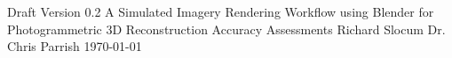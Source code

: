 \documentclass{article}
\begin{document}
\insertOSUTitleTwo
{Draft}
{Version 0.2}
{A Simulated Imagery Rendering Workflow using Blender for Photogrammetric 3D Reconstruction Accuracy Assessments}
{Richard}
{Slocum}
{Dr. Chris}
{Parrish}
{\today}
	

\cleardoublepage











\cleardoublepage

	
\end{document}
